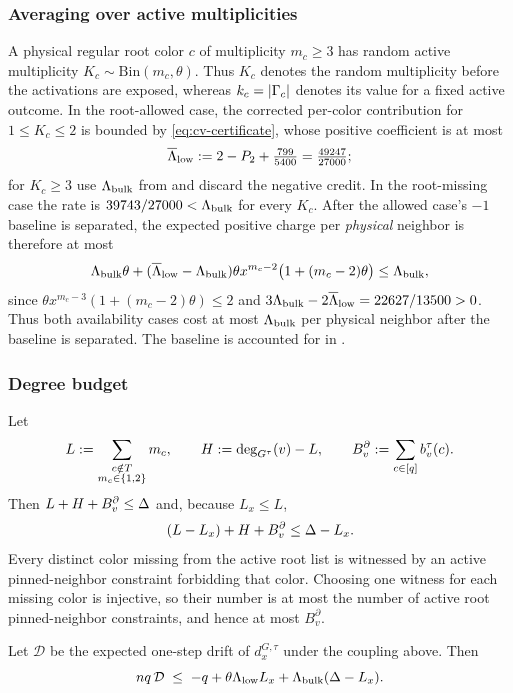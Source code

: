 \subsubsection{Averaging over active multiplicities}
A physical regular root color \(c\) of multiplicity \(m_c\ge3\) has random
active multiplicity \(K_c\sim\mathrm{Bin}(m_c,\theta)\).  Thus \(K_c\)
denotes the random multiplicity before the activations are exposed, whereas
\(k_c=\left|\Gamma_c\right|\) denotes its value for a fixed active outcome.  In the
root-allowed case, the corrected per-color contribution for
\(1\le K_c\le2\) is
bounded by \eqref{eq:cv-certificate}, whose positive coefficient is at most
\[
 \overline\Lambda_{\rm low}:=
 2-P_2+\tfrac{799}{5400}=\tfrac{49247}{27000};
\]
for \(K_c\ge3\) use $\Lambda_{\rm bulk}$ from  and discard
the negative credit. In the root-missing case the rate is
\(39743/27000<\Lambda_{\rm bulk}\) for every \(K_c\). After the allowed case's
$-1$ baseline is separated,
the expected positive charge per
\emph{physical} neighbor is therefore at most
\[
 \Lambda_{\rm bulk}\theta+
 (\overline\Lambda_{\rm low}-\Lambda_{\rm bulk})
 \theta x^{m_c-2}\bigl(1+(m_c-2)\theta\bigr)
 \le\Lambda_{\rm bulk},
\]
since \(\theta x^{m_c-3}(1+(m_c-2)\theta)\le2\) and
$3\Lambda_{\rm bulk}-2\overline\Lambda_{\rm low}
=22627/13500>0$.  Thus both availability cases cost at most
$\Lambda_{\rm bulk}$ per physical neighbor after the baseline is
separated. The baseline is accounted for in
.

\subsubsection{Degree budget}
Let
\[
 L:=\sum_{\substack{c\notin T\\m_c\in\left\{1,2\right\}}}m_c,\qquad
 H:=\deg_{G^\tau}(v)-L,\qquad
 B_v^{\partial}:=\sum_{c\in[q]}b_v^\tau(c).
\]
Then $L+H+B_v^{\partial}\le\Delta$ and, because $L_x\le L$,
\begin{equation}\label{eq:cv-resource}
 (L-L_x)+H+B_v^{\partial}\le\Delta-L_x.
\end{equation}
Every distinct color missing from the active root list is witnessed by an
active pinned-neighbor constraint forbidding that color.  Choosing one witness
for each missing color is injective, so their number is at most the number
of active root pinned-neighbor constraints, and hence at most \(B_v^{\partial}\).

\begin{lemma}\label{lem:cv-assembly}
Let $\mathcal D$ be the expected one-step drift of $d_x^{G,\tau}$ under the coupling
above. Then
\begin{equation}\label{eq:cv-envelope}
  nq\,\mathcal D\;\le\;-q
      +\theta\Lambda_{\rm low}L_x
      +\Lambda_{\rm bulk}(\Delta-L_x).
\end{equation}
\end{lemma}

